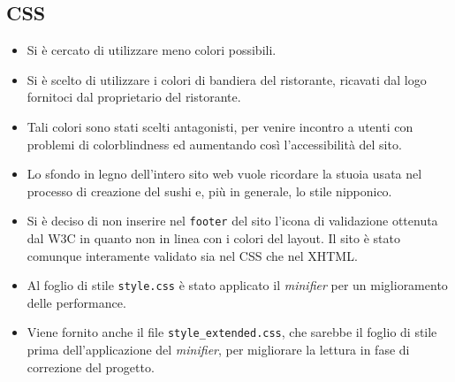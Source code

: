 \documentclass[../relazione.tex]{subfiles}
\begin{document}
	\subsection{CSS}
	\begin{itemize}
		\item Si è cercato di utilizzare meno colori possibili.
		\item Si è scelto di utilizzare i colori di bandiera del ristorante, ricavati dal logo fornitoci dal proprietario del ristorante.
		\item Tali colori sono stati scelti antagonisti, per venire incontro a utenti con problemi di colorblindness ed aumentando così l'accessibilità del sito.
		\item Lo sfondo in legno dell'intero sito web vuole ricordare la stuoia usata nel processo di creazione del sushi e, più in generale, lo stile nipponico.
		\item Si è deciso di non inserire nel \texttt{footer} del sito l'icona di validazione ottenuta dal W3C in quanto non in linea con i colori del layout. Il sito è stato comunque interamente validato sia nel CSS che nel XHTML.
		\item Al foglio di stile \texttt{style.css} è stato applicato il \textit{minifier} per un miglioramento delle performance.
		\item Viene fornito anche il file \texttt{style\_extended.css}, che sarebbe il foglio di stile prima dell'applicazione del \textit{minifier}, per migliorare la lettura in fase di correzione del progetto.
	\end{itemize}
\end{document}

